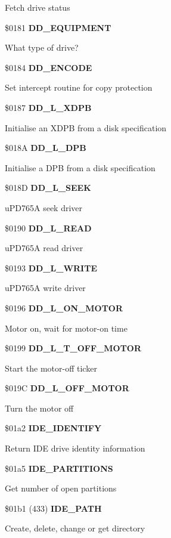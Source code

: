 Fetch drive status

\$0181 \textbf{DD\_EQUIPMENT}

What type of drive?

\$0184 \textbf{DD\_ENCODE}

Set intercept routine for copy protection

\$0187 \textbf{DD\_L\_XDPB}

Initialise an XDPB from a disk specification

\$018A \textbf{DD\_L\_DPB}

Initialise a DPB from a disk specification

\$018D \textbf{DD\_L\_SEEK}

uPD765A seek driver

\$0190 \textbf{DD\_L\_READ}

uPD765A read driver

\$0193 \textbf{DD\_L\_WRITE}

uPD765A write driver

\$0196 \textbf{DD\_L\_ON\_MOTOR}

Motor on, wait for motor-on time

\$0199 \textbf{DD\_L\_T\_OFF\_MOTOR}

Start the motor-off ticker

\$019C \textbf{DD\_L\_OFF\_MOTOR}

Turn the motor off

\$01a2 \textbf{IDE\_IDENTIFY}

Return IDE drive identity information

\$01a5 \textbf{IDE\_PARTITIONS}

Get number of open partitions

\$01b1 (433) \textbf{IDE\_PATH}

Create, delete, change or get directory

%

